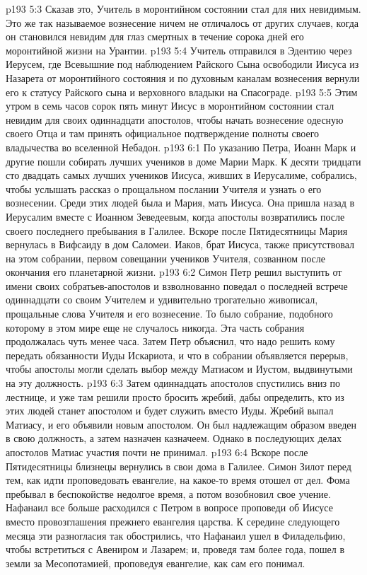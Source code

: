 \vs p193 5:3 \pc Сказав это, Учитель в моронтийном состоянии стал для них невидимым. Это же так называемое вознесение ничем не отличалось от других случаев, когда он становился невидим для глаз смертных в течение сорока дней его моронтийной жизни на Урантии.
\vs p193 5:4 Учитель отправился в Эдентию через Иерусем, где Всевышние под наблюдением Райского Сына освободили Иисуса из Назарета от моронтийного состояния и по духовным каналам вознесения вернули его к статусу Райского сына и верховного владыки на Спасограде.
\vs p193 5:5 Этим утром в семь часов сорок пять минут Иисус в моронтийном состоянии стал невидим для своих одиннадцати апостолов, чтобы начать вознесение одесную своего Отца и там принять официальное подтверждение полноты своего владычества во вселенной Небадон.
\vs p193 6:1 По указанию Петра, Иоанн Марк и другие пошли собирать лучших учеников в доме Марии Марк. К десяти тридцати сто двадцать самых лучших учеников Иисуса, живших в Иерусалиме, собрались, чтобы услышать рассказ о прощальном послании Учителя и узнать о его вознесении. Среди этих людей была и Мария, мать Иисуса. Она пришла назад в Иерусалим вместе с Иоанном Зеведеевым, когда апостолы возвратились после своего последнего пребывания в Галилее. Вскоре после Пятидесятницы Мария вернулась в Вифсаиду в дом Саломеи. Иаков, брат Иисуса, также присутствовал на этом собрании, первом совещании учеников Учителя, созванном после окончания его планетарной жизни.
\vs p193 6:2 Симон Петр решил выступить от имени своих собратьев\hyp{}апостолов и взволнованно поведал о последней встрече одиннадцати со своим Учителем и удивительно трогательно живописал, прощальные слова Учителя и его вознесение. То было собрание, подобного которому в этом мире еще не случалось никогда. Эта часть собрания продолжалась чуть менее часа. Затем Петр объяснил, что надо решить кому передать обязанности Иуды Искариота, и что в собрании объявляется перерыв, чтобы апостолы могли сделать выбор между Матиасом и Иустом, выдвинутыми на эту должность.
\vs p193 6:3 Затем одиннадцать апостолов спустились вниз по лестнице, и уже там решили просто бросить жребий, дабы определить, кто из этих людей станет апостолом и будет служить вместо Иуды. Жребий выпал Матиасу, и его объявили новым апостолом. Он был надлежащим образом введен в свою должность, а затем назначен казначеем. Однако в последующих делах апостолов Матиас участия почти не принимал.
\vs p193 6:4 \pc Вскоре после Пятидесятницы близнецы вернулись в свои дома в Галилее. Симон Зилот перед тем, как идти проповедовать евангелие, на какое\hyp{}то время отошел от дел. Фома пребывал в беспокойстве недолгое время, а потом возобновил свое учение. Нафанаил все больше расходился с Петром в вопросе проповеди об Иисусе вместо провозглашения прежнего евангелия царства. К середине следующего месяца эти разногласия так обострились, что Нафанаил ушел в Филадельфию, чтобы встретиться с Авениром и Лазарем; и, проведя там более года, пошел в земли за Месопотамией, проповедуя евангелие, как сам его понимал.
